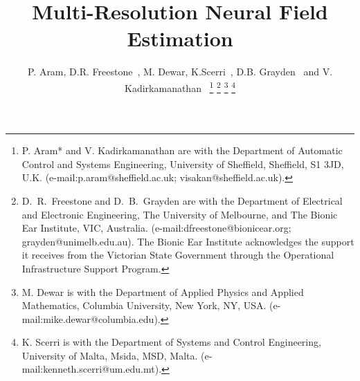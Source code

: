 \documentclass[journal]{IEEEtran}
\begin{document}
%
\title{Multi-Resolution Neural Field Estimation }


\author{P. Aram, D.R. Freestone~, M. Dewar, K.Scerri~, D.B. Grayden~ and V. Kadirkamanathan~ %
\thanks{P. Aram* and V. Kadirkamanathan are with the Department of Automatic Control and Systems Engineering, University of Sheffield, Sheffield, S1 3JD, U.K. (e-mail:p.aram@sheffield.ac.uk; visakan@sheffield.ac.uk).}%
\thanks{D.\ R.\ Freestone and D.\ B.\ Grayden are with the Department
of Electrical and Electronic Engineering, The University of Melbourne, and The Bionic Ear Institute, VIC, Australia. (e-mail:dfreestone@bionicear.org; grayden@unimelb.edu.au). The Bionic Ear Institute acknowledges the support it receives from the Victorian State Government through the Operational Infrastructure Support Program.}
\thanks{M. Dewar is with the Department of Applied Physics and Applied Mathematics, Columbia University, New York, NY, USA. (e-mail:mike.dewar@columbia.edu).}
\thanks{K. Scerri is with the Department of Systems and Control Engineering, University
of Malta, Msida, MSD, Malta. (e-mail:kenneth.scerri@um.edu.mt).}}



% 
 \ifCLASSOPTIONpeerreview
\else
\fi


\maketitle
\end{document}
